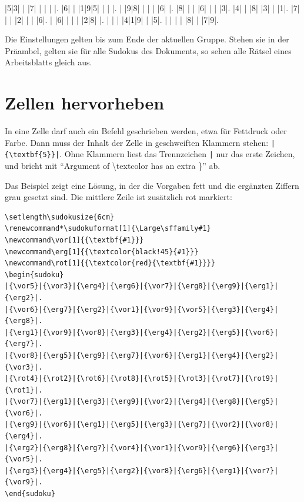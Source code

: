 \begin{ausgabe}
\setlength\sudokusize{6cm}
\setlength\sudokuthinline{0.4pt}
\setlength\sudokuthickline{1.6pt}
\renewcommand*\sudokuformat[1]{\Large\sffamily#1}
\begin{sudoku}
|5|3| | |7| | | | |.
|6| | |1|9|5| | | |.
| |9|8| | | | |6| |.
|8| | | |6| | | |3|.
|4| | |8| |3| | |1|.
|7| | | |2| | | |6|.
| |6| | | | |2|8| |.
| | | |4|1|9| | |5|.
| | | | |8| | |7|9|.
\end{sudoku}
\end{ausgabe}

Die Einstellungen gelten bis zum Ende der aktuellen Gruppe. Stehen sie in der Präambel, gelten sie für alle Sudokus des Dokuments, so sehen alle Rätsel eines Arbeitsblatts gleich aus.



\section{Zellen hervorheben}

In eine Zelle darf auch ein Befehl geschrieben werden, etwa für Fettdruck oder Farbe. Dann muss der Inhalt der Zelle in geschweiften Klammern stehen: \texttt{|\{\textbackslash textbf\{5\}\}|}. Ohne Klammern liest das Trennzeichen \texttt{|} nur das erste Zeichen, und  bricht mit \enquote{Argument of \textbackslash textcolor has an extra \}} ab.

Das Beispiel zeigt eine Lösung, in der die Vorgaben fett und die ergänzten Ziffern grau gesetzt sind. Die mittlere Zeile ist zusätzlich rot markiert:

\begin{lstlisting}[style=latex]
\setlength\sudokusize{6cm}
\renewcommand*\sudokuformat[1]{\Large\sffamily#1}
\newcommand\vor[1]{{\textbf{#1}}}
\newcommand\erg[1]{{\textcolor{black!45}{#1}}}
\newcommand\rot[1]{{\textcolor{red}{\textbf{#1}}}}
\begin{sudoku}
|{\vor5}|{\vor3}|{\erg4}|{\erg6}|{\vor7}|{\erg8}|{\erg9}|{\erg1}|{\erg2}|.
|{\vor6}|{\erg7}|{\erg2}|{\vor1}|{\vor9}|{\vor5}|{\erg3}|{\erg4}|{\erg8}|.
|{\erg1}|{\vor9}|{\vor8}|{\erg3}|{\erg4}|{\erg2}|{\erg5}|{\vor6}|{\erg7}|.
|{\vor8}|{\erg5}|{\erg9}|{\erg7}|{\vor6}|{\erg1}|{\erg4}|{\erg2}|{\vor3}|.
|{\rot4}|{\rot2}|{\rot6}|{\rot8}|{\rot5}|{\rot3}|{\rot7}|{\rot9}|{\rot1}|.
|{\vor7}|{\erg1}|{\erg3}|{\erg9}|{\vor2}|{\erg4}|{\erg8}|{\erg5}|{\vor6}|.
|{\erg9}|{\vor6}|{\erg1}|{\erg5}|{\erg3}|{\erg7}|{\vor2}|{\vor8}|{\erg4}|.
|{\erg2}|{\erg8}|{\erg7}|{\vor4}|{\vor1}|{\vor9}|{\erg6}|{\erg3}|{\vor5}|.
|{\erg3}|{\erg4}|{\erg5}|{\erg2}|{\vor8}|{\erg6}|{\erg1}|{\vor7}|{\vor9}|.
\end{sudoku}
\end{lstlisting}

